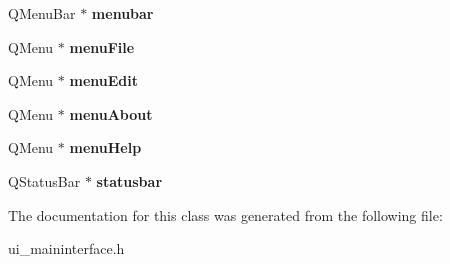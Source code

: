 \begin{DoxyCompactItemize}
Q\+Menu\+Bar $\ast$ {\bfseries menubar}
\item 
\mbox{\label{class_ui___main_interface_a3a53115e5bf5177498eec50383ded88e}} 
Q\+Menu $\ast$ {\bfseries menu\+File}
\item 
\mbox{\label{class_ui___main_interface_ae4d4faf77dabdbca081a63a391064f5d}} 
Q\+Menu $\ast$ {\bfseries menu\+Edit}
\item 
\mbox{\label{class_ui___main_interface_ae92e5df68d19536cbcee393c3e0f8e3e}} 
Q\+Menu $\ast$ {\bfseries menu\+About}
\item 
\mbox{\label{class_ui___main_interface_aa4df7b043497b32bab6d8ec963c51f0c}} 
Q\+Menu $\ast$ {\bfseries menu\+Help}
\item 
\mbox{\label{class_ui___main_interface_ad362fbb2901be56c9a961d0ffbfc7932}} 
Q\+Status\+Bar $\ast$ {\bfseries statusbar}
\end{DoxyCompactItemize}


The documentation for this class was generated from the following file\+:\begin{DoxyCompactItemize}
\item 
ui\+\_\+maininterface.\+h\end{DoxyCompactItemize}
